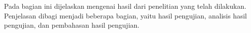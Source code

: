 Pada bagian ini dijelaskan mengenai hasil dari penelitian yang telah dilakukan. Penjelasan dibagi menjadi beberapa bagian, yaitu hasil pengujian, analisis hasil pengujian, dan pembahasan hasil pengujian.